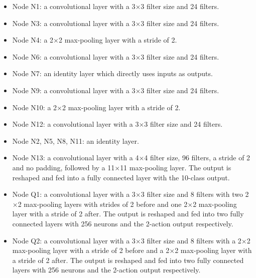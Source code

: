 \documentclass[10pt,twocolumn,letterpaper]{article}
\begin{document}
\begin{itemize}
\item Node N1: a convolutional layer with a 3$\times$3 filter size and 24 filters.

\item Node N3: a convolutional layer with a 3$\times$3 filter size and 24 filters.
  
\item Node N4: a 2$\times$2 max-pooling layer with a stride of 2.
  
\item Node N6: a convolutional layer with a 3$\times$3 filter size and 24 filters.
  
\item Node N7: an identity layer which directly uses inputs as outputs.

\item Node N9: a convolutional layer with a 3$\times$3 filter size and 24 filters.

\item Node N10: a 2$\times$2 max-pooling layer with a stride of 2.

\item Node N12: a convolutional layer with a 3$\times$3 filter size and 24 filters.

\item Node N2, N5, N8, N11: an identity layer.
  
\item Node N13: a convolutional layer with a 4$\times$4 filter size, 96 filters, a stride of 2 and no padding,
  followed by a 11$\times$11 max-pooling layer.
  The output is reshaped and fed into a fully connected layer with the 10-class output.
 
\item Node Q1:  a convolutional layer with a 3$\times$3 filter size and 8 filters with two 2$\times$2 max-pooling layers with strides of 2 before
  and one 2$\times$2 max-pooling layer with a stride of 2 after.
  The output is reshaped and fed into two fully connected layers with 256 neurons and the 2-action output respectively.

\item Node Q2:  a convolutional layer with a 3$\times$3 filter size and 8 filters with a 2$\times$2 max-pooling layer with a stride of 2 before
  and a 2$\times$2 max-pooling layer with a stride of 2 after.
  The output is reshaped and fed into two fully connected layers with 256 neurons and the 2-action output respectively.


\end{itemize}
\end{document}
